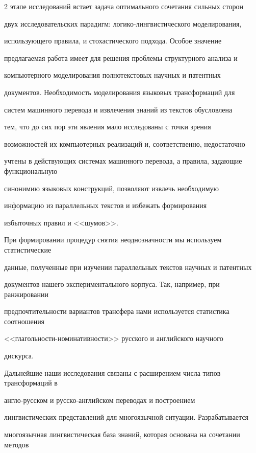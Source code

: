 \begin{multicols}{2}
этапе исследований встает задача оптимального сочетания сильных сторон


двух исследовательских парадигм: логико-лингвистического моделирования,


использующего правила, и стохастического подхода. Особое значение


предлагаемая работа имеет для решения проблемы структурного анализа и


компьютерного моделирования полнотекстовых научных и патентных


документов. Необходимость моделирования языковых трансформаций для


систем машинного перевода и извлечения знаний из текстов обусловлена


тем, что до сих пор эти явления мало исследованы с точки зрения


возможностей их компьютерных реализаций и, соответственно, недостаточно


учтены в действующих системах машинного перевода, а правила, задающие функциональную


синонимию языковых конструкций, позволяют извлечь необходимую


информацию из параллельных текстов и избежать формирования


избыточных правил и <<шумов>>.





При формировании процедур снятия неоднозначности мы используем статистические 


данные, полученные при изучении параллельных текстов научных и патентных 


документов нашего экспериментального корпуса. Так, например, при ранжировании 


предпочтительности вариантов трансфера нами используется статистика соотношения 


<<гла\-голь\-но\-сти-но\-ми\-на\-тив\-но\-сти>> русского и английского научного 


дискурса.





Дальнейшие наши исследования связаны с расширением числа типов трансформаций в 


анг\-ло-рус\-ском и рус\-ско-анг\-лий\-ском переводах и построением 


лингвистических представлений для многоязычной ситуации. Разрабатывается 


многоязычная лингвистическая база знаний, которая основана на сочетании методов 



\end{multicols}

